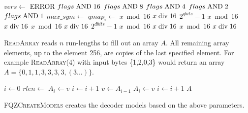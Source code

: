 \documentclass[a4paper]{article}
\begin{document}
\begin{algorithmic}[1]
  \State $vers \gets $
    \State ERROR
  \EndIf
  \settowidth{\maxwidth}{do\_strand\ }
  \State {} 
  \State {}    $flags\bitand 16$
  \State {} $flags\bitand 8$
  \State {}    $flags\bitand 4$
  \State {}  $flags\bitand 2$
  \State {}   $flags\bitand 1$
  \State {} 
    \State $max\_sym \gets$ 
      \State $qmap_i \gets$ 
    \EndFor
  \EndIf
  \settowidth{\maxwidth}{qshift\ }
  \State {} 
  \State {} $x \bmod 16$
  \State {} $x \bdiv 16$
  \State {} $2^{qbits}-1$
  \State {} 
  \State {} $x \bmod 16$
  \State {} $x \bdiv 16$
  \State {} 
  \State {} $x \bmod 16$
  \State {} $x \bdiv 16$
  \State {} $2^{dbits}-1$
  \State {} 
  \State {} $x \bmod 16$
  \State {} $x \bdiv 16$
  \State {} 
  \State {} $x \bmod 16$
  \State {} $x \bdiv 16$
  \State {} 
\EndProcedure
\end{algorithmic}

\textsc{ReadArray} reads $n$ run-lengths to fill out an array $A$.
All remaining array elements, up to the element 256, are copies of the
last specified element. For example \textsc{ReadArray}(4) with input
bytes \{1,2,0,3\} would return an array $A = \{0,1,1,3,3,3,3, (3 ...)\}$.

\begin{algorithmic}[1]
\State $i \gets 0$
  \State $rlen \gets $
    \State $A_i \gets v$
    \State $i \gets i+1$
  \EndFor
\EndFor
\State $v \gets A_{i-1}$
  \State $A_i \gets v$
  \State $i \gets i+1$
\EndWhile
\State \Return $A$
\EndFunction
\end{algorithmic}

\textsc{FQZCreateModels} creates the decoder models based on the above parameters.
\end{document}
